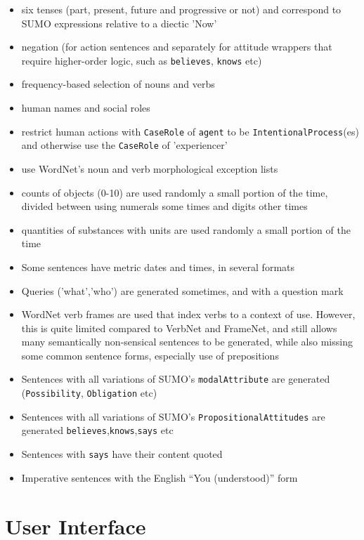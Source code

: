 \documentclass[letterpaper]{article}
\begin{document}
\begin{itemize}
\item six tenses (part, present, future and progressive or not) and correspond to SUMO expressions relative to a diectic 'Now'
\item  negation (for action sentences and separately for attitude wrappers that require higher-order logic, such as \texttt{believes}, \texttt{knows} etc)
\item  frequency-based selection of nouns and verbs
\item  human names and social roles
\item  restrict human actions with \texttt{CaseRole} of \texttt{agent} to be \texttt{IntentionalProcess}(es) and otherwise use the \texttt{CaseRole} of 'experiencer'
\item  use WordNet's noun and verb morphological exception lists
\item  counts of objects (0-10) are used randomly a small portion of the time, divided between using numerals some times and digits other times
\item  quantities of substances with units are used randomly a small portion of the time
\item  Some sentences have metric dates and times, in several formats
\item  Queries ('what','who') are generated sometimes, and with a question mark
\item  WordNet verb frames are used that index verbs to a context of use. However, this is quite limited compared to VerbNet and FrameNet, and still allows many semantically non-sensical sentences to be generated, while also missing some common sentence forms, especially use of prepositions
\item  Sentences with all variations of SUMO's \texttt{modalAttribute} are generated (\texttt{Possibility}, \texttt{Obligation} etc)
\item  Sentences with all variations of SUMO's \texttt{PropositionalAttitudes} are generated \texttt{believes},\texttt{knows},\texttt{says} etc
\item  Sentences with \texttt{says} have their content quoted
\item Imperative sentences with the English ``You (understood)'' form
\end{itemize}

\section{User Interface}
\end{document}
